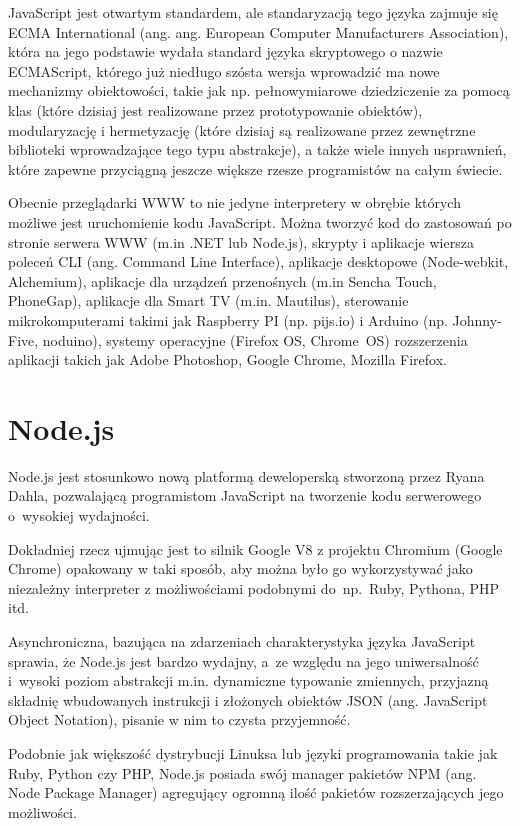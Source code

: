 \documentclass[twoside,a4paper]{book}
\begin{document}
JavaScript jest otwartym standardem, ale standaryzacją tego języka zajmuje się ECMA International (ang. ang. European Computer Manufacturers Association), która na jego podstawie wydała standard języka skryptowego o nazwie ECMAScript, którego już niedługo szósta wersja wprowadzić ma nowe mechanizmy obiektowości, takie jak np. pełnowymiarowe dziedziczenie za pomocą klas (które dzisiaj jest realizowane przez prototypowanie obiektów), modularyzację i hermetyzację (które dzisiaj są realizowane przez zewnętrzne biblioteki wprowadzające tego typu abstrakcje), a także wiele innych usprawnień, które zapewne przyciągną jeszcze większe rzesze programistów na całym świecie.

Obecnie przeglądarki WWW to nie jedyne interpretery w obrębie których możliwe jest uruchomienie kodu JavaScript. Można tworzyć kod do zastosowań po stronie serwera WWW (m.in .NET lub Node.js), skrypty i aplikacje wiersza poleceń CLI (ang. Command Line Interface), aplikacje desktopowe (Node-webkit, Alchemium), aplikacje dla urządzeń przenośnych (m.in Sencha Touch, PhoneGap), aplikacje dla Smart TV (m.in. Mautilus), sterowanie mikrokomputerami takimi jak Raspberry PI (np. pijs.io) i Arduino (np. Johnny-Five, noduino), systemy operacyjne (Firefox OS, Chrome~OS) rozszerzenia aplikacji takich jak Adobe Photoshop, Google Chrome, Mozilla Firefox.


\section{Node.js}

Node.js jest stosunkowo nową platformą deweloperską stworzoną przez Ryana Dahla, pozwalającą programistom JavaScript na tworzenie kodu serwerowego o~wysokiej wydajności.

Dokładniej rzecz ujmując jest to silnik Google V8 z projektu Chromium (Google Chrome) opakowany w taki sposób, aby można było go wykorzystywać jako niezależny interpreter z możliwościami podobnymi do~np.~Ruby, Pythona, PHP itd.

Asynchroniczna, bazująca na zdarzeniach charakterystyka języka JavaScript sprawia, że Node.js jest bardzo wydajny, a~ze względu na jego uniwersalność i~wysoki poziom abstrakcji m.in. dynamiczne typowanie zmiennych, przyjazną składnię wbudowanych instrukcji i złożonych obiektów JSON (ang. JavaScript Object Notation), pisanie w nim to czysta przyjemność.

Podobnie jak większość dystrybucji Linuksa lub języki programowania takie jak Ruby, Python czy PHP, Node.js posiada swój manager pakietów NPM (ang. Node Package Manager) agregujący ogromną ilość pakietów rozszerzających jego możliwości.
\end{document}
